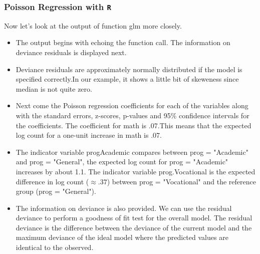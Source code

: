 \documentclass[00-GLMregslides.tex]{subfiles}
\begin{document}
\begin{frame}[fragile]

\frametitle{Poisson Regression with \texttt{R}}
\Large 
Now let's look at the output of function glm more closely.
\begin{itemize}
 \item The output begins with echoing the function call. The information on deviance residuals is displayed next. 
 \item Deviance residuals are approximately normally distributed if the model is specified correctly.In our example, it shows a little bit of skeweness since median is not quite zero. 
\end{itemize}
\end{frame}

\begin{frame}
\begin{itemize}
\item Next come the Poisson regression coefficients for each of the variables along with the standard errors, z-scores, p-values and 95\% confidence intervals for the coefficients. The coefficient for math is .07.This means that the expected log count for a one-unit increase in math is .07. 
\end{itemize}
\end{frame}

\begin{frame}
	\begin{itemize}

\item The indicator variable progAcademic compares between prog = "Academic" and prog = "General", the expected log count for prog = "Academic" increases by about 1.1. The indicator variable prog.Vocational is the expected difference in log count (\(\approx .37\)) between prog = "Vocational" and the reference group (prog = "General").
\end{itemize}
\end{frame}

\begin{frame}
	\begin{itemize}

\item The information on deviance is also provided. We can use the residual deviance to perform a goodness of fit test for the overall model. The residual deviance is the difference between the deviance of the current model and the maximum deviance of the ideal model where the predicted values are identical to the observed. 
\end{itemize}
\end{frame}
\end{document}
